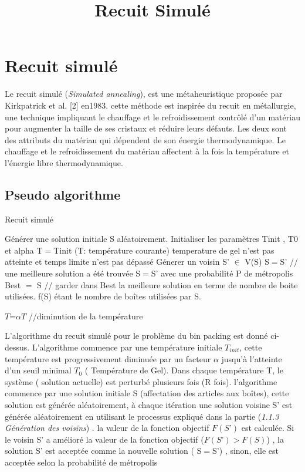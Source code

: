 \documentclass[12pt]{article}
\title{Recuit Simulé}
\begin{document}
\section{Recuit simulé}
    Le recuit simulé (\emph{Simulated annealing}), est une métaheuristique proposée par Kirkpatrick et al. [2] en1983. cette méthode est inspirée du recuit en métallurgie, une technique impliquant le chauffage et le refroidissement contrôlé d'un matériau pour augmenter la taille de ses cristaux et réduire leurs défauts. Les deux sont des attributs du matériau qui dépendent de son énergie thermodynamique. Le chauffage et le refroidissement du matériau affectent à la fois la température et l'énergie libre thermodynamique.

\subsection{Pseudo algorithme}

\begin{algorithm}[H]
    \caption{Recuit simulé}
    \begin{algorithmic}
    \STATE Générer une solution initiale S aléatoirement. 
    \STATE Initialiser les paramètres Tinit , T0 et alpha 
    \STATE T$=$Tinit  (T: température courante)
        \STATE temperature de gel n'est pas atteinte et temps limite n'est pas dépassé
        \REPEAT{}
            \STATE Génerer un voisin S' $\in$ V(S) 
                \STATE S$=$S' // une meilleure solution a été trouvée 
            \ELSE
                \STATE S$=$S' avec une probabilité P de métropolis 
            \ENDIF
                \STATE  Best $=$ S // garder dans Best la meilleure solution en terme de nombre de boite utilisées. f(S) étant le nombre de                 boîtes utilisées par S.

            \ENDIF
        \STATE $T$=$ \alpha T $  //diminution de la température 
    \ENDWHILE
     
\end{algorithmic}
\end{algorithm}

    L’algorithme du recuit simulé pour le problème du bin packing est donné ci-dessus.
 L’algorithme commence par une température initiale \emph{$T_{init}$}, cette température est progressivement diminuée par un facteur $\alpha$ jusqu'à l’atteinte d’un seuil minimal \emph{$T_{0}$} ( Température de Gel). 
Dans chaque température T, le système ( solution actuelle) est perturbé plusieurs fois (R fois). 
l’algorithme commence par une solution initiale S (affectation des articles aux boîtes), 
cette solution est générée aléatoirement, à chaque itération une solution voisine S’ est générée aléatoirement en utilisant le processus expliqué dans la partie (\emph{1.1.3 Génération des voisins}) . 
la valeur de la fonction objectif $F (S’)$ est calculée. 
Si le voisin S’ a amélioré la valeur de la fonction objectif ($ F(S’)> F(S)$)  , 
la solution S’ est acceptée comme la nouvelle solution ( S$= $S’) , sinon, elle est acceptée selon la probabilité de métropolis \newline
\end{document}
